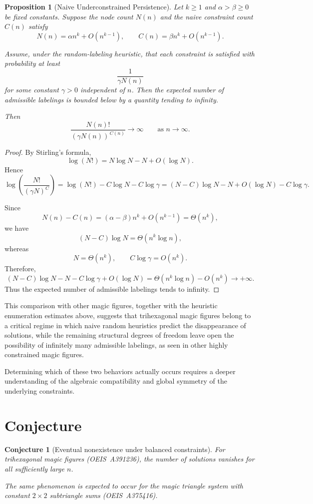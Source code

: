 \documentclass[11pt]{article}
\theoremstyle{plain}
\newtheorem{proposition}[theorem]{Proposition}
\newtheorem{conjecture}[theorem]{Conjecture}
\theoremstyle{definition}
\begin{document}
\begin{proposition}[Naive Underconstrained Persistence]
Let $k \ge 1$ and $\alpha > \beta \ge 0$ be fixed constants. 
Suppose the node count $N(n)$ and the naive constraint count $C(n)$ satisfy
\[
N(n) = \alpha n^k + O(n^{k-1}), 
\qquad
C(n) = \beta n^k + O(n^{k-1}).
\]

Assume, under the random-labeling heuristic, that each constraint is
satisfied with probability at least
\[
\frac{1}{\gamma N(n)}
\]
for some constant $\gamma>0$ independent of $n$. Then the expected number
of admissible labelings is bounded below by a quantity tending to infinity.

Then
\[
\frac{N(n)!}{(\gamma N(n))^{\,C(n)}} \longrightarrow \infty
\qquad \text{as } n \to \infty.
\]
\end{proposition}

\begin{proof}
By Stirling's formula,
\[
\log(N!) = N \log N - N + O(\log N).
\]
Hence
\[
\log\!\left(\frac{N!}{(\gamma N)^{C}}\right)
=
\log(N!) - C \log N  - C \log \gamma 
=
(N-C)\log N - N + O(\log N) - C \log \gamma .
\]

Since
\[
N(n)-C(n)=(\alpha-\beta)n^k+O(n^{k-1})=\Theta(n^k),
\]
we have
\[
(N-C)\log N=\Theta(n^k\log n),
\]
whereas
\[
N=\Theta(n^k),
\qquad
C\log\gamma=O(n^k).
\]
Therefore,
\[
(N-C)\log N - N - C\log\gamma + O(\log N)
=
\Theta(n^k\log n)-O(n^k)
\longrightarrow +\infty.
\]
Thus the expected number of admissible labelings tends to infinity.
\end{proof}

This comparison with other magic figures, together with the heuristic
enumeration estimates above, suggests that trihexagonal magic figures
belong to a critical regime in which naive random heuristics predict the
disappearance of solutions, while the remaining structural degrees of
freedom leave open the possibility of infinitely many admissible labelings,
as seen in other highly constrained magic figures.

Determining which of these two behaviors actually occurs requires a deeper 
understanding of the algebraic compatibility and global symmetry of the 
underlying constraints. 


\section{Conjecture}

\begin{conjecture}[Eventual nonexistence under balanced constraints]
For trihexagonal magic figures (OEIS~A391236)\cite{OEISA391236}, the number of solutions
vanishes for all sufficiently large $n$.

The same phenomenon is expected to occur for the magic triangle system
with constant $2\times2$ subtriangle sums (OEIS~A375416)\cite{OEISA375416}.
\end{conjecture}
\end{document}
